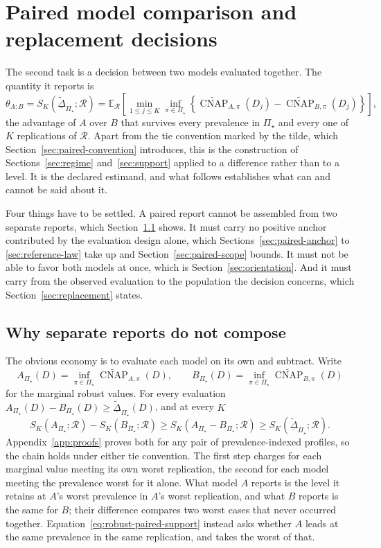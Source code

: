 \documentclass[11pt]{article}
\newcommand{\CNAP}{\operatorname{CNAP}}
\newcommand{\Regime}{\mathcal{R}}
\newcommand{\PSet}{\Pi_\star}
\newcommand{\E}{\mathbb{E}}
\newcommand{\CNAPta}{\widetilde{\CNAP}}
\newcommand{\RobDta}{\underline{\widetilde{\Delta}}_{\PSet}}
\theoremstyle{remark}
\begin{document}
\section{Paired model comparison and replacement decisions}
\label{sec:paired}

The second task is a decision between two models evaluated together. The quantity it reports is
\begin{equation}
\theta_{A:B}
=
S_K(\RobDta;\Regime)
=
\E_{\Regime}
\left[
\min_{1\leq j\leq K}
\inf_{\pi\in\PSet}
\left\{
\CNAPta_{A,\pi}(D_j)
-
\CNAPta_{B,\pi}(D_j)
\right\}
\right],
\label{eq:robust-paired-support}
\end{equation}
the advantage of $A$ over $B$ that survives every prevalence in $\PSet$ and every one of $K$ replications of $\Regime$. Apart from the tie convention marked by the tilde, which Section~\ref{sec:paired-convention} introduces, this is the construction of Sections~\ref{sec:regime} and~\ref{sec:support} applied to a difference rather than to a level. It is the declared estimand, and what follows establishes what can and cannot be said about it.

Four things have to be settled. A paired report cannot be assembled from two separate reports, which Section~\ref{sec:marginal} shows. It must carry no positive anchor contributed by the evaluation design alone, which Sections~\ref{sec:paired-anchor} to \ref{sec:reference-law} take up and Section~\ref{sec:paired-scope} bounds. It must not be able to favor both models at once, which is Section~\ref{sec:orientation}. And it must carry from the observed evaluation to the population the decision concerns, which Section~\ref{sec:replacement} states.

\subsection{Why separate reports do not compose}
\label{sec:marginal}

The obvious economy is to evaluate each model on its own and subtract. Write
\[
A_{\PSet}(D)
=
\inf_{\pi\in\PSet}\CNAPta_{A,\pi}(D),
\qquad
B_{\PSet}(D)
=
\inf_{\pi\in\PSet}\CNAPta_{B,\pi}(D)
\]
for the marginal robust values. For every evaluation $A_{\PSet}(D)-B_{\PSet}(D)\geq\RobDta(D)$, and at every $K$
\begin{equation}
S_K(A_{\PSet};\Regime)
-
S_K(B_{\PSet};\Regime)
\geq
S_K(A_{\PSet}-B_{\PSet};\Regime)
\geq
S_K(\RobDta;\Regime).
\label{eq:robust-marginal-order}
\end{equation}
Appendix~\ref{app:proofs} proves both for any pair of prevalence-indexed profiles, so the chain holds under either tie convention. The first step charges for each marginal value meeting its own worst replication, the second for each model meeting the prevalence worst for it alone. What model $A$ reports is the level it retains at $A$'s worst prevalence in $A$'s worst replication, and what $B$ reports is the same for $B$; their difference compares two worst cases that never occurred together. Equation~\eqref{eq:robust-paired-support} instead asks whether $A$ leads at the same prevalence in the same replication, and takes the worst of that.
\end{document}
